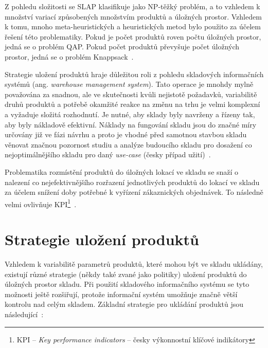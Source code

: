 Z pohledu složitosti se SLAP klasifikuje jako NP-těžký problém, a to vzhledem k množství variací způsobených množstvím produktů a úložných prostor. Vzhledem k tomu, mnoho meta-heuristických a heuristických metod bylo použito za účelem řešení této problematiky. Pokud je počet produktů roven počtu úložných prostor, jedná se o problém QAP\footnotemark{}. Pokud počet produktů převyšuje počet úložných prostor, jedná se o problém Knappsack~\cite{slapReview}.

Strategie uložení produktů hraje důležitou roli z pohledu skladových informačních systémů (ang. \emph{warehouse management system}). Tato operace je mnohdy mylně považována za snadnou, ale ve skutečnosti kvůli nejistotě požadavků, variabilitě druhů produktů a potřebě okamžité reakce na změnu na trhu je velmi komplexní a vyžaduje složitá rozhodnutí. Je nutné, aby sklady byly navrženy a řízeny tak, aby byly nákladově efektivní. Náklady na fungování skladu jsou do značné míry určovány již ve fázi návrhu a proto je vhodné před samotnou stavbou skladu věnovat značnou pozornost studiu a analýze budoucího skladu pro dosažení co nejoptimálnějšího skladu pro daný \emph{use-case} (česky případ užití)~\cite{slapSeacomp, slapReview}.

\addtocounter{footnote}{-1}



Problematika rozmístění produktů do úložných lokací ve skladu se snaží o nalezení co nejefektivnějšího rozřazení jednotlivých produktů do lokací ve skladu za účelem snížení doby potřebné k vyřízení zákaznických objednávek. To následně velmi ovlivňuje KPI\footnote{KPI -- \emph{Key performance indicators} -- česky výkonnostní klíčové indikátory}~\cite{slapPickAndPass}.

\section{Strategie uložení produktů}
Vzhledem k variabilitě parametrů produktů, které mohou být ve skladu ukládány, existují různé strategie (někdy také zvané jako politiky) uložení produktů do úložných prostor skladu. Při použití skladového informačního systému se tyto možnosti ještě rozšiřují, protože informační systém umožňuje značně větší kontrolu nad celým skladem. Základní strategie pro ukládání produktů jsou následující~\cite{slapSeacomp}\cite{slapPickAndPass}:


